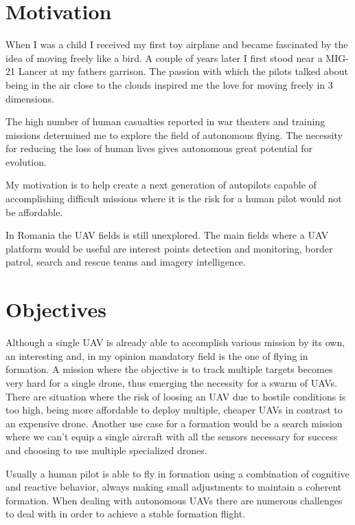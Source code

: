 \section{Motivation}
\label{sec:motivation}
When I was a child I received my first toy airplane and became fascinated
by the idea of moving freely like a bird. A couple of years later I first stood 
near a MIG-21 Lancer at my fathers garrison. The passion with which the pilots 
talked about being in the air close to the clouds inspired me the love for moving 
freely in 3 dimensions.

The high number of human casualties reported in war theaters and training missions
determined me to explore the field of autonomous flying. The necessity for reducing
the loss of human lives gives autonomous great potential for evolution.

My motivation is to help create a next generation of autopilots capable of 
accomplishing difficult missions where it is the risk for a human pilot would 
not be affordable.

In Romania the UAV fields is still unexplored. The main fields where a UAV
platform would be useful are interest points detection and monitoring, border
patrol, search and rescue teams and imagery intelligence.

\section{Objectives}
\label{sec:objectives}

Although a single UAV is already able to accomplish various mission by its
own, an interesting and, in my opinion mandatory field is the one of flying in
formation. A mission where the objective is to track multiple targets becomes
very hard for a single drone, thus emerging the necessity for a swarm of UAVs.
There are situation where the risk of loosing an UAV due to hostile conditions
is too high, being more affordable to deploy multiple, cheaper UAVs in contrast
to an expensive drone. Another use case for a formation would be a search mission
where we can't equip a single aircraft with all the sensors necessary for success
and choosing to use multiple specialized drones.

Usually a human pilot is able to fly in formation using a combination of
cognitive and reactive behavior,  always making small adjustments to maintain a
coherent formation. When dealing with autonomous UAVs there are numerous challenges 
to deal with in order to achieve a stable formation flight.

